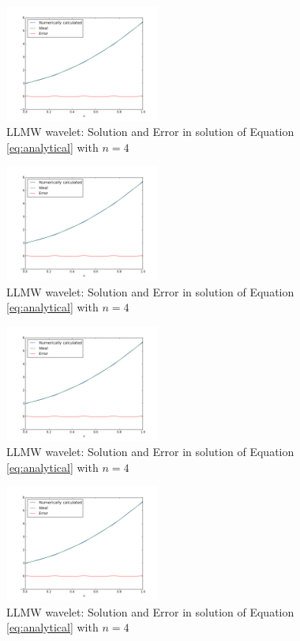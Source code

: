 \documentclass{scrartcl}
\begin{document}
\lipsum[10-40]

\begin{figure}
        \centering{}
\includegraphics[width=2in]{allmw4.png}
\caption{\label{fig:allmw4}LLMW wavelet: Solution and Error in solution of Equation \ref{eq:analytical} with $n=4$}
\end{figure}

\begin{figure}
        \centering{}
\includegraphics[width=2in]{allmw4.png}
\caption{\label{fig:allmw4}LLMW wavelet: Solution and Error in solution of Equation \ref{eq:analytical} with $n=4$}
\end{figure}

\begin{figure}
        \centering{}
\includegraphics[width=2in]{allmw4.png}
\caption{\label{fig:allmw4}LLMW wavelet: Solution and Error in solution of Equation \ref{eq:analytical} with $n=4$}
\end{figure}

\begin{figure}
        \centering{}
\includegraphics[width=2in]{allmw4.png}
\caption{\label{fig:allmw4}LLMW wavelet: Solution and Error in solution of Equation \ref{eq:analytical} with $n=4$}
\end{figure}
\end{document}
